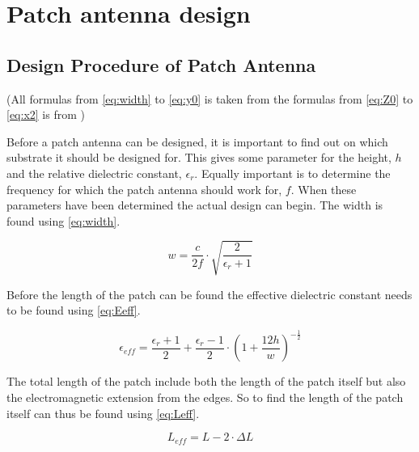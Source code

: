 \chapter{Patch antenna design}

\section{Design Procedure of Patch Antenna}

(All formulas from \autoref{eq:width} to \autoref{eq:y0} is taken from \citep{bog} the formulas from \autoref{eq:Z0} to \autoref{eq:x2} is from \citep{web})

Before a patch antenna can be designed, it is important to find out on which substrate it should be designed for. This gives some parameter for the height, $h$ and the relative dielectric constant, $\epsilon_r$. Equally important is to determine the frequency for which the patch antenna should work for, $f$. When these parameters have been determined the actual design can begin. The width is found using \autoref{eq:width}.

\begin{equation}\label{eq:width}
w = \frac{c}{2f} \cdot \sqrt{\frac{2}{ \epsilon_{r}+1}}
\end{equation}
\begin{where}
\end{where}

Before the length of the patch can be found the effective dielectric constant needs to be found using \autoref{eq:Eeff}. 

\begin{equation}\label{eq:Eeff}
\epsilon_{eff} = \frac{\epsilon_{r}+1}{2} +\frac{\epsilon_{r}-1}{2}\cdot\left(1+\frac{12h}{w}\right)^{-\frac{1}{2}}
\end{equation}
\begin{where}
\end{where}

The total length of the patch include both the length of the patch itself but also the electromagnetic extension from the edges. So to find the length of the patch itself can thus be found using \autoref{eq:Leff}.

\begin{equation}\label{eq:Leff}
L_{eff} = L-2\cdot\Delta L
\end{equation}
\begin{where}
\end{where}

